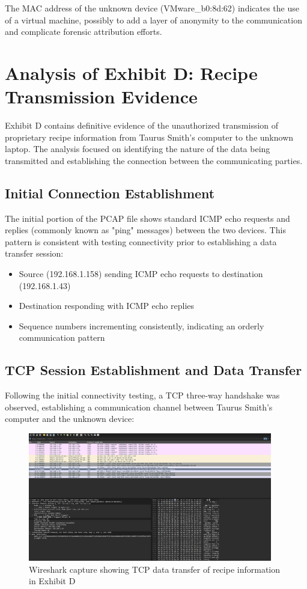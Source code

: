 The MAC address of the unknown device (VMware\_b0:8d:62) indicates the use of a virtual machine, possibly to add a layer of anonymity to the communication and complicate forensic attribution efforts.

\section{Analysis of Exhibit D: Recipe Transmission Evidence}

Exhibit D contains definitive evidence of the unauthorized transmission of proprietary recipe information from Taurus Smith's computer to the unknown laptop. The analysis focused on identifying the nature of the data being transmitted and establishing the connection between the communicating parties.

\subsection{Initial Connection Establishment}
The initial portion of the PCAP file shows standard ICMP echo requests and replies (commonly known as "ping" messages) between the two devices. This pattern is consistent with testing connectivity prior to establishing a data transfer session:

\begin{itemize}
    \item Source (192.168.1.158) sending ICMP echo requests to destination (192.168.1.43)
    \item Destination responding with ICMP echo replies
    \item Sequence numbers incrementing consistently, indicating an orderly communication pattern
\end{itemize}

\subsection{TCP Session Establishment and Data Transfer}
Following the initial connectivity testing, a TCP three-way handshake was observed, establishing a communication channel between Taurus Smith's computer and the unknown device:

\begin{figure}[htbp]
    \centering
    \includegraphics[width=0.95\textwidth]{images/Network_Analysis/ExhibitD_pcap.png}
    \caption{Wireshark capture showing TCP data transfer of recipe information in Exhibit D}
    \label{fig:exhibit_d_recipe}
\end{figure}

